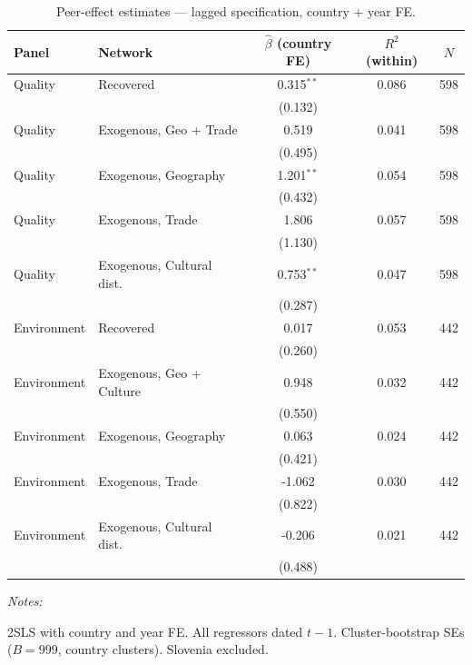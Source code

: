 \documentclass[
  letterpaper,
  DIV=11,
  numbers=noendperiod]{scrartcl}
\begin{document}
\begin{table}[!h]
\centering
\caption{\label{tab:tab:bdf_twfe_lag}Peer-effect estimates — lagged specification, country $+$ year FE.}
\centering
\fontsize{9}{11}\selectfont
\begin{threeparttable}
\begin{tabular}[t]{llccc}
\toprule
Panel & Network & $\hat\beta$ (country FE) & $R^2$ (within) & $N$\\
\midrule
Quality & Recovered & 0.315$^{**}$ & 0.086 & 598\\
 &  & (0.132) &  & \\
Quality & Exogenous, Geo + Trade & 0.519 & 0.041 & 598\\
 &  & (0.495) &  & \\
Quality & Exogenous, Geography & 1.201$^{**}$ & 0.054 & 598\\
\addlinespace
 &  & (0.432) &  & \\
Quality & Exogenous, Trade & 1.806 & 0.057 & 598\\
 &  & (1.130) &  & \\
Quality & Exogenous, Cultural dist. & 0.753$^{**}$ & 0.047 & 598\\
 &  & (0.287) &  & \\
\addlinespace
Environment & Recovered & 0.017 & 0.053 & 442\\
 &  & (0.260) &  & \\
Environment & Exogenous, Geo + Culture & 0.948 & 0.032 & 442\\
 &  & (0.550) &  & \\
Environment & Exogenous, Geography & 0.063 & 0.024 & 442\\
\addlinespace
 &  & (0.421) &  & \\
Environment & Exogenous, Trade & -1.062 & 0.030 & 442\\
 &  & (0.822) &  & \\
Environment & Exogenous, Cultural dist. & -0.206 & 0.021 & 442\\
 &  & (0.488) &  & \\
\bottomrule
\end{tabular}
\begin{tablenotes}[para]
\item \textit{Notes:} 
\item 2SLS with country and year FE. All regressors dated $t-1$. Cluster-bootstrap SEs ($B=999$, country clusters). Slovenia excluded.
\end{tablenotes}
\end{threeparttable}
\end{table}
\end{document}
